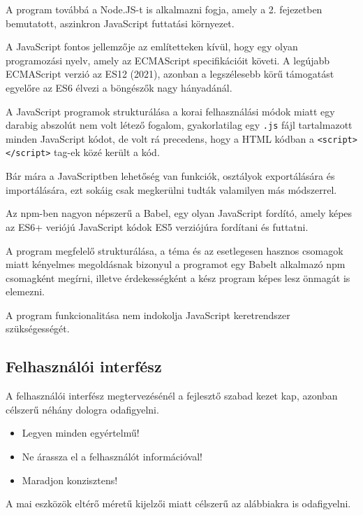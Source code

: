 A program továbbá a Node.JS-t is alkalmazni fogja, amely a 2. fejezetben bemutatott, aszinkron JavaScript futtatási környezet.

A JavaScript fontos jellemzője az említetteken kívül, hogy egy olyan programozási nyelv, amely az ECMAScript specifikációit követi. A legújabb ECMAScript verzió az ES12 (2021), azonban a legszélesebb körű támogatást egyelőre az ES6 élvezi a böngészők nagy hányadánál. 

A JavaScript programok strukturálása a korai felhasználási módok miatt egy darabig abszolút nem volt létező fogalom, gyakorlatilag egy \texttt{.js} fájl tartalmazott minden JavaScript kódot, de volt rá precedens, hogy a HTML kódban a \texttt{<script></script>} tag-ek közé került a kód.

Bár mára a JavaScriptben lehetőség van funkciók, osztályok exportálására és importálására, ezt sokáig csak megkerülni tudták valamilyen más módszerrel.

Az npm-ben nagyon népszerű a Babel, egy olyan JavaScript fordító, amely képes az ES6+ veriójú JavaScript kódok ES5 verziójúra fordítani és futtatni. \cite{babel}

A program megfelelő strukturálása, a téma és az esetlegesen hasznos csomagok miatt kényelmes megoldásnak bizonyul a programot egy Babelt alkalmazó npm csomagként megírni, illetve érdekességként a kész program képes lesz önmagát is elemezni.

A program funkcionalitása nem indokolja JavaScript keretrendszer szükségességét.

\pagebreak


\subsection{Felhasználói interfész}

A felhasználói interfész megtervezésénél a fejlesztő szabad kezet kap, azonban célszerű néhány dologra odafigyelni.

\begin{itemize}
	\item Legyen minden egyértelmű!
	\item Ne árassza el a felhasználót információval!
	\item Maradjon konzisztens!
\end{itemize}

\noindent A mai eszközök eltérő méretű kijelzői miatt célszerű az alábbiakra is odafigyelni.

